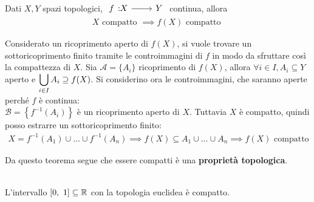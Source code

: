 \begin{theorema}\label{immagine compatto}
	Dati $X,Y$ spazi topologici, $\funz f X Y$ continua, allora
		\begin{gather*}
			X \text{ compatto } \implies f(X) \text{ compatto }
		\end{gather*}
	\vspace{-6mm}
\end{theorema}
\begin{demonstration}
	Considerato un ricoprimento aperto di $f(X)$, si vuole trovare un sottoricoprimento finito tramite le controimmagini di $f$ in modo da sfruttare così la compattezza di $X$. \newline
	Sia  $\mathcal{A}=\{A_i\}$ ricoprimento di $f(X)$, allora $\forall i\in I, A_i\subseteq Y$ aperto e $\displaystyle \mathop{{\bigcup}}\displaylimits_{i\in I}A_i \supseteq f(X)$. \newline
	Si considerino ora le controimmagini, che saranno aperte perché $f$ è continua:\\ $\mathcal{B}=\left\{f^{-1}(A_i)\right\}$ è un ricoprimento aperto di $X$. Tuttavia $X$ è compatto, quindi posso estrarre un sottoricoprimento finito:
		\begin{gather*}
			X=f^{-1}(A_1) \cup	\dots \cup f^{-1}(A_n) \implies f(X)\subseteq A_1\cup \dots \cup A_n \implies f(X) \text{ compatto}
		\end{gather*}
	\vspace{-6mm}
\end{demonstration}
Da questo teorema segue che essere compatti è una \textbf{proprietà topologica}.
\begin{theorema}[${[0,\ 1]}$ è un compatto.]~{}\\
	L'intervallo $[0,\ 1]\subseteq\mathbb{R}$ con la topologia euclidea è compatto.
\end{theorema}

